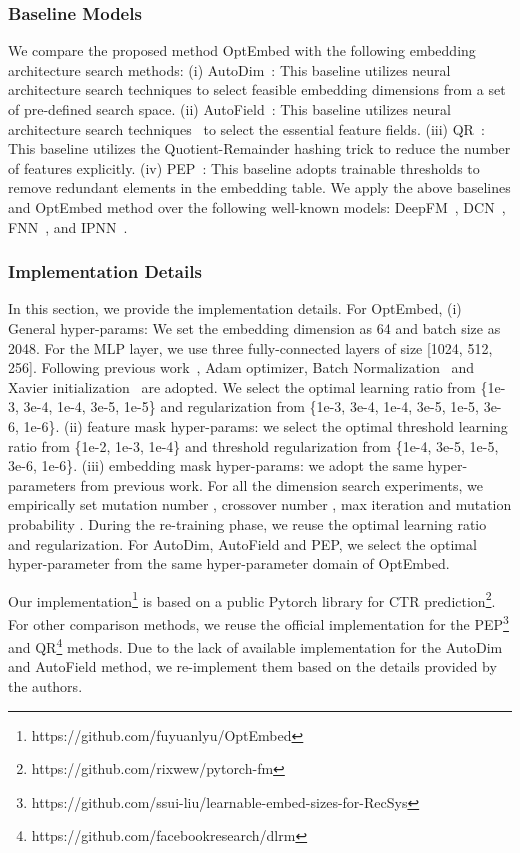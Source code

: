 \documentclass[sigconf]{acmart}
\begin{document}
\subsubsection{Baseline Models}

We compare the proposed method OptEmbed with the following embedding architecture search methods: 
(i) AutoDim~\cite{AutoDim}: This baseline utilizes neural architecture search techniques\cite{DARTS} to select feasible embedding dimensions from a set of pre-defined search space. 
(ii) AutoField~\cite{autofield}: This baseline utilizes neural architecture search techniques~\cite{DARTS} to select the essential feature fields. 
(iii) QR~\cite{QR}: This baseline utilizes the Quotient-Remainder hashing trick to reduce the number of features explicitly.
(iv) PEP~\cite{PEP}: This baseline adopts trainable thresholds to remove redundant elements in the embedding table. 
We apply the above baselines and OptEmbed method over the following well-known models: DeepFM~\cite{DeepFM}, DCN~\cite{DCN}, FNN~\cite{FNN}, and IPNN~\cite{IPNN}.




\subsubsection{Implementation Details}
In this section, we provide the implementation details. For OptEmbed, (i) General hyper-params: We set the embedding dimension as 64 and batch size as 2048. For the MLP layer, we use three fully-connected layers of size [1024, 512, 256]. Following previous work~\cite{IPNN}, Adam optimizer, Batch Normalization~\cite{BatchNorm} and Xavier initialization~\cite{Xavier} are adopted. We select the optimal learning ratio from \{1e-3, 3e-4, 1e-4, 3e-5, 1e-5\} and  regularization from \{1e-3, 3e-4, 1e-4, 3e-5, 1e-5, 3e-6, 1e-6\}. (ii) feature mask hyper-params: we select the optimal threshold learning ratio  from \{1e-2, 1e-3, 1e-4\} and threshold regularization  from \{1e-4, 3e-5, 1e-5, 3e-6, 1e-6\}.  (iii) embedding mask hyper-params: we adopt the same hyper-parameters from previous work\cite{One-shot}. For all the dimension search experiments, we empirically set mutation number , crossover number , max iteration  and mutation probability . During the re-training phase, we reuse the optimal learning ratio and  regularization. For AutoDim, AutoField and PEP, we select the optimal hyper-parameter from the same hyper-parameter domain of OptEmbed.

Our implementation\footnote{https://github.com/fuyuanlyu/OptEmbed} is based on a public Pytorch library for CTR prediction\footnote{https://github.com/rixwew/pytorch-fm}. For other comparison methods, we reuse the official implementation for the PEP\footnote{https://github.com/ssui-liu/learnable-embed-sizes-for-RecSys}\cite{PEP} and QR\footnote{https://github.com/facebookresearch/dlrm}\cite{QR} methods. Due to the lack of available implementation for the AutoDim\cite{AutoDim} and AutoField\cite{autofield} method, we re-implement them based on the details provided by the authors.
\end{document}
